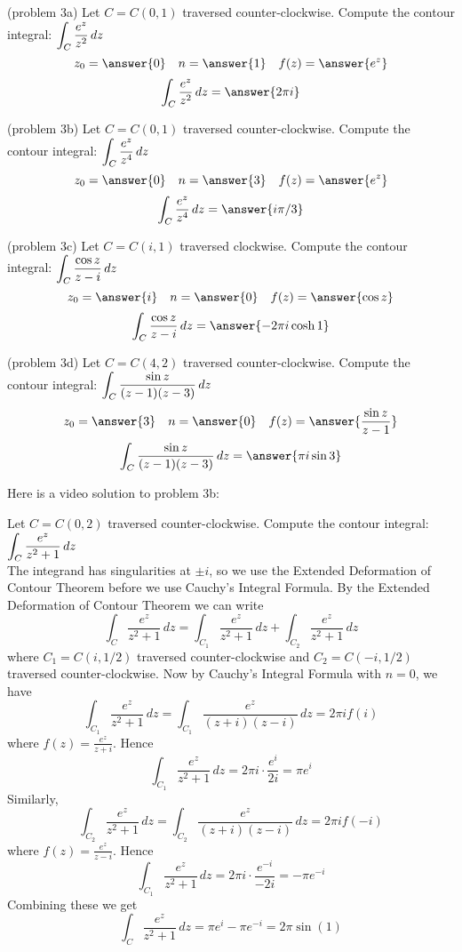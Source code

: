 \documentclass[handout]{ximera}
\begin{document}
\begin{problem}(problem 3a)
Let $C = C(0, 1)$ traversed counter-clockwise. Compute the contour integral: $\displaystyle \int_C \frac{e^z}{z^2} \, dz$\\
\[
z_0 = \answer{0} \quad n = \answer{1} \quad f(z) = \answer{e^z}
\]
\[
\int_C \frac{e^z}{z^2} \, dz = \answer{2\pi i}
\]
\end{problem}
\begin{problem}(problem 3b)
Let $C = C(0, 1)$ traversed counter-clockwise. Compute the contour integral: $\displaystyle \int_C \frac{e^z}{z^4} \, dz$\\
\[
z_0 = \answer{0} \quad n = \answer{3} \quad f(z) = \answer{e^z}
\]
\[
\int_C \frac{e^z}{z^4}\, dz = \answer{i \pi /3}
\]
\end{problem}
\begin{problem}(problem 3c)
Let $C = C(i, 1)$ traversed clockwise. Compute the contour integral: $\displaystyle \int_C \frac{\cos z}{z-i} \, dz$\\
\[
z_0 = \answer{i} \quad n = \answer{0} \quad f(z) = \answer{\cos z}
\]
\[
\int_C \frac{\cos z}{z-i}\, dz = \answer{-2\pi i \cosh 1}
\]
\end{problem}
\begin{problem}(problem 3d)
Let $C = C(4, 2)$ traversed counter-clockwise. Compute the contour integral: $\displaystyle \int_C \frac{\sin z}{(z-1)(z-3)} \, dz$\\
\[
z_0 = \answer{3} \quad n = \answer{0} \quad f(z) = \answer{\frac{\sin z}{z-1}}
\]
\[
\int_C \frac{\sin z}{(z-1)(z-3)} \, dz = \answer{\pi i \sin 3}
\]
\end{problem}

Here is a video solution to problem 3b:\\
\begin{foldable}
\end{foldable}


\begin{example}[example 4]
Let $C = C(0, 2)$ traversed counter-clockwise. Compute the contour integral: $\displaystyle \int_C \frac{e^z}{z^2 +1} \, dz$\\
The integrand has singularities at $\pm i$, so we use the Extended Deformation of Contour Theorem before we use Cauchy's Integral Formula.
By the Extended Deformation of Contour Theorem we can write
\[
\int_C \frac{e^z}{z^2 +1} \, dz = \int_{C_1} \frac{e^z}{z^2 +1} \, dz +  \int_{C_2} \frac{e^z}{z^2 +1} \, dz 
\]
where $C_1 = C(i, 1/2)$ traversed counter-clockwise and $C_2 = C(-i, 1/2)$ traversed counter-clockwise.
Now by Cauchy's Integral Formula with $n = 0$, we have
\[
\int_{C_1} \frac{e^z}{z^2 +1} \, dz = \int_{C_1} \frac{e^z}{(z+i)(z-i)} \, dz = 2\pi i f(i)
\]
where $f(z) = \frac{e^z}{z+i}$.
Hence
\[
\int_{C_1} \frac{e^z}{z^2 +1} \, dz = 2\pi i \cdot \frac{e^i}{2i} = \pi e^i
\]
Similarly,
\[
\int_{C_2} \frac{e^z}{z^2 +1} \, dz = \int_{C_2} \frac{e^z}{(z+i)(z-i)} \, dz = 2\pi i f(-i)
\]
where $f(z) = \frac{e^z}{z-i}$.
Hence
\[
\int_{C_1} \frac{e^z}{z^2 +1} \, dz = 2\pi i \cdot \frac{e^{-i}}{-2i} = -\pi e^{-i}
\]
Combining these we get
\[
\int_C \frac{e^z}{z^2 +1} \, dz = \pi e^i - \pi e^{-i} = 2\pi \sin(1)
\]
\end{example}
\end{document}
